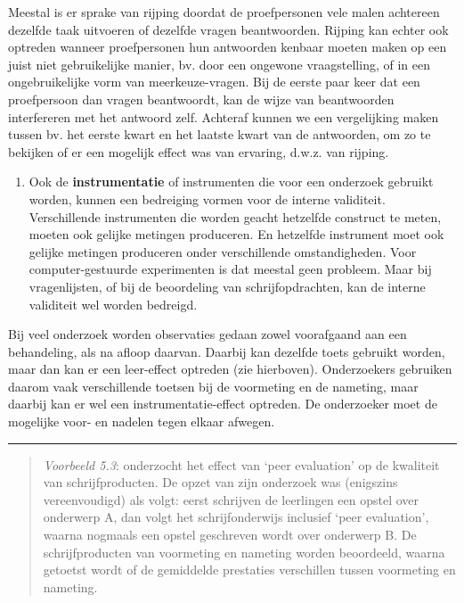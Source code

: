 \documentclass[
]{book}
\providecommand{\tightlist}{%
  \setlength{\itemsep}{0pt}\setlength{\parskip}{0pt}}
\begin{document}
Meestal is er sprake van rijping doordat de proefpersonen vele malen
achtereen dezelfde taak uitvoeren of dezelfde vragen beantwoorden.
Rijping kan echter ook optreden wanneer proefpersonen hun antwoorden
kenbaar moeten maken op een juist niet gebruikelijke manier, bv. door
een ongewone vraagstelling, of in een ongebruikelijke vorm van
meerkeuze-vragen. Bij de eerste paar keer dat een proefpersoon dan
vragen beantwoordt, kan de wijze van beantwoorden interfereren met het
antwoord zelf. Achteraf kunnen we een vergelijking maken tussen bv. het
eerste kwart en het laatste kwart van de antwoorden, om zo te bekijken
of er een mogelijk effect was van ervaring, d.w.z. van rijping.

\begin{enumerate}
\def\labelenumi{\arabic{enumi}.}
\setcounter{enumi}{2}
\tightlist
\item
  Ook de \textbf{instrumentatie} of instrumenten die voor een onderzoek
  gebruikt worden, kunnen een bedreiging vormen voor de interne
  validiteit. Verschillende instrumenten die worden geacht hetzelfde
  construct te meten, moeten ook gelijke metingen produceren. En hetzelfde
  instrument moet ook gelijke metingen produceren onder verschillende
  omstandigheden. Voor computer-gestuurde experimenten is dat meestal geen
  probleem. Maar bij vragenlijsten, of bij de beoordeling van
  schrijfopdrachten, kan de interne validiteit wel worden bedreigd.
\end{enumerate}

Bij veel onderzoek worden observaties gedaan zowel voorafgaand aan een
behandeling, als na afloop daarvan. Daarbij kan dezelfde toets gebruikt
worden, maar dan kan er een leer-effect optreden (zie hierboven).
Onderzoekers gebruiken daarom vaak verschillende toetsen bij de
voormeting en de nameting, maar daarbij kan er wel een
instrumentatie-effect optreden. De onderzoeker moet de mogelijke voor-
en nadelen tegen elkaar afwegen.

\begin{center}\rule{0.5\linewidth}{0.5pt}\end{center}

\begin{quote}
\emph{Voorbeeld 5.3}: \citep{Rijl86}
onderzocht het effect van `peer evaluation' op de kwaliteit van
schrijfproducten. De opzet van zijn onderzoek was (enigszins
vereenvoudigd) als volgt: eerst schrijven de leerlingen een opstel over
onderwerp A, dan volgt het schrijfonderwijs inclusief `peer evaluation',
waarna nogmaals een opstel geschreven wordt over onderwerp B. De
schrijfproducten van voormeting en nameting worden beoordeeld, waarna
getoetst wordt of de gemiddelde prestaties verschillen tussen voormeting
en nameting.
\end{quote}
\end{document}
